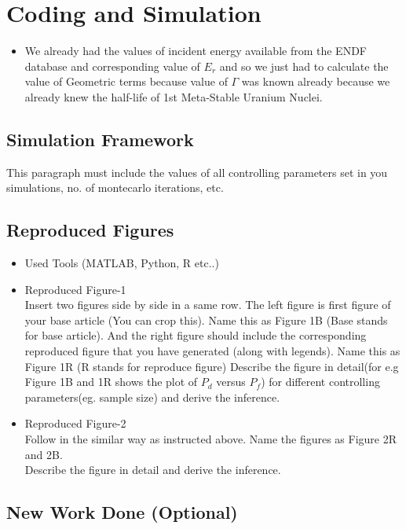\documentclass{article}
\begin{document}
\section{Coding and Simulation}
\begin{itemize}
    \item We already had the values of incident energy available from the ENDF database and corresponding value of $E_r$ and so we just had to calculate the value of Geometric terms because value of $\Gamma$ was known already because we already knew the half-life of 1st Meta-Stable Uranium Nuclei.
\end{itemize}
\subsection{Simulation Framework}
\justify This paragraph must include the values of all controlling parameters set in you simulations, no. of montecarlo iterations, etc.
\subsection{Reproduced Figures}
\begin{itemize}
\item Used Tools (MATLAB, Python, R etc..)
\item Reproduced Figure-1\\
Insert two figures side by side in a same row. The left figure is first figure of your base article (You can crop this). Name this as Figure 1B (Base stands for base article). And the right figure should include the corresponding reproduced figure that you have generated (along with legends). Name this as Figure 1R (R stands for reproduce figure)
Describe the figure in detail(for e.g Figure 1B and 1R shows the plot of $P_d$ versus $P_f$) for different controlling parameters(eg. sample size) and derive the inference.

\item Reproduced Figure-2\\
Follow in the similar way as instructed above. Name the figures as Figure 2R and 2B. \\
Describe the figure in detail and derive the inference.
\end{itemize}

\subsection{New Work Done (Optional)}
\end{document}
